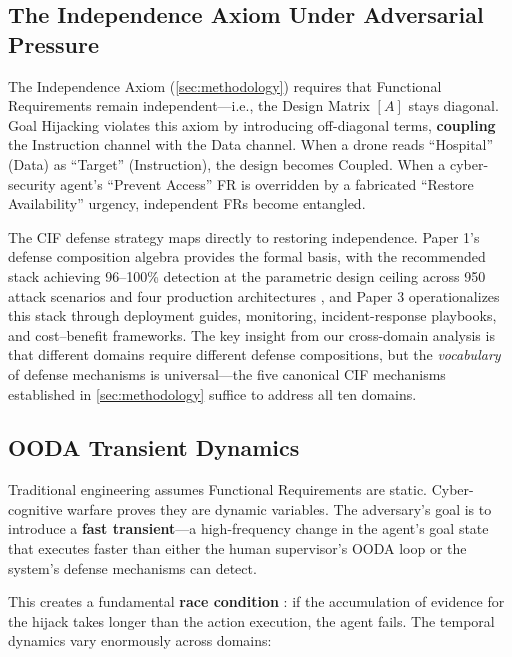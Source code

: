 \documentclass[
]{article}
\begin{document}
\subsection{The Independence Axiom Under Adversarial
Pressure}\label{the-independence-axiom-under-adversarial-pressure}

The Independence Axiom (\cref{sec:methodology}) requires that Functional
Requirements remain independent---i.e., the Design Matrix \([A]\) stays
diagonal. Goal Hijacking violates this axiom by introducing off-diagonal
terms, \textbf{coupling} the Instruction channel with the Data channel.
When a drone reads ``Hospital'' (Data) as ``Target'' (Instruction), the
design becomes Coupled. When a cyber-security agent's ``Prevent Access''
FR is overridden by a fabricated ``Restore Availability'' urgency,
independent FRs become entangled.

The CIF defense strategy maps directly to restoring independence. Paper
1's defense composition algebra \cite{friedman2026cogsec1} provides the
formal basis, with the recommended stack achieving 96--100\% detection
at the parametric design ceiling across 950 attack scenarios and four
production architectures \cite{friedman2026cogsec2}, and Paper 3
\cite{friedman2026cogsec3} operationalizes this stack through deployment
guides, monitoring, incident-response playbooks, and cost--benefit
frameworks. The key insight from our cross-domain analysis is that
different domains require different defense compositions, but the
\emph{vocabulary} of defense mechanisms is universal---the five
canonical CIF mechanisms established in \cref{sec:methodology} suffice
to address all ten domains.

\subsection{OODA Transient Dynamics}\label{ooda-transient-dynamics}

Traditional engineering assumes Functional Requirements are static.
Cyber-cognitive warfare proves they are dynamic variables. The
adversary's goal is to introduce a \textbf{fast transient}---a
high-frequency change in the agent's goal state that executes faster
than either the human supervisor's OODA loop or the system's defense
mechanisms can detect.

This creates a fundamental \textbf{race condition}
\cite{osinga2007science}: if the accumulation of evidence for the hijack
takes longer than the action execution, the agent fails. The temporal
dynamics vary enormously across domains:
\end{document}
